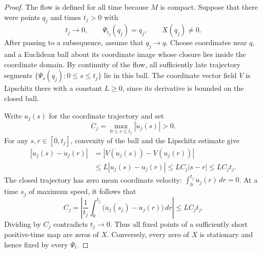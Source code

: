 \begin{proof}
The flow is defined for all time because \(M\) is compact. Suppose that
there were points \(q_j\) and times \(t_j>0\) with
\[
  t_j\longrightarrow0,\qquad
  \Psi_{t_j}(q_j)=q_j,\qquad X(q_j)\ne0.
\]
After passing to a subsequence, assume that \(q_j\to q\). Choose
coordinates near \(q\), and a Euclidean ball about its coordinate image
whose closure lies inside the coordinate domain. By continuity of the
flow, all sufficiently late trajectory segments
\(\{\Psi_s(q_j):0\le s\le t_j\}\) lie in this ball. The coordinate vector
field \(V\) is Lipschitz there with a constant \(L\ge0\), since its
derivative is bounded on the closed ball.

Write \(u_j(s)\) for the coordinate trajectory and set
\[
  C_j=\max_{0\le s\le t_j}|\dot u_j(s)|>0.
\]
For any \(s,r\in[0,t_j]\), convexity of the ball and the Lipschitz
estimate give
\[
 \begin{split}
  |\dot u_j(s)-\dot u_j(r)|
   &=|V(u_j(s))-V(u_j(r))|\\
   &\le L|u_j(s)-u_j(r)|
    \le LC_j|s-r|
    \le LC_jt_j.
 \end{split}
\]
The closed trajectory has zero mean coordinate velocity:
\(\int_0^{t_j}\dot u_j(r)\,dr=0\). At a time \(s_j\) of maximum speed,
it follows that
\[
  C_j
  =\left|
     \frac1{t_j}\int_0^{t_j}
        \bigl(\dot u_j(s_j)-\dot u_j(r)\bigr)\,dr
    \right|
  \le LC_jt_j.
\]
Dividing by \(C_j\) contradicts \(t_j\to0\). Thus all fixed points of a
sufficiently short positive-time map are zeros of \(X\). Conversely,
every zero of \(X\) is stationary and hence fixed by every \(\Psi_t\).
\end{proof}

